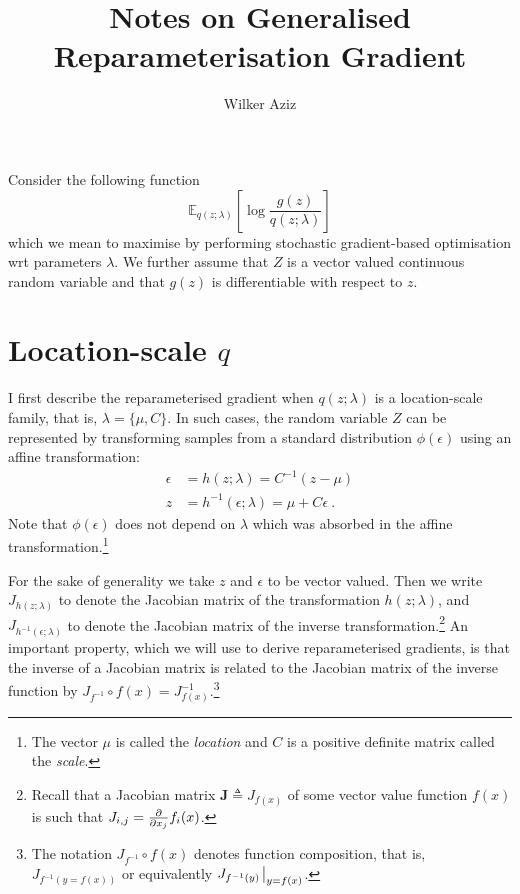 \documentclass[11pt]{article}
\title{Notes on Generalised Reparameterisation Gradient}
\author{Wilker Aziz}
\begin{document}
\maketitle

Consider the following function
\begin{equation}\label{eq:objective}
	\mathbb E_{q(z; \lambda)} \left [ \log \frac{g(z)}{q(z; \lambda)} \right]
\end{equation}
which we mean to maximise by performing stochastic gradient-based optimisation wrt parameters $\lambda$.
We further assume that $Z$ is a vector valued continuous random variable and that $g(z)$ is differentiable with respect to $z$.

\section{Location-scale $q$}

I first describe the reparameterised gradient when $q(z; \lambda)$ is a location-scale family, that is, $\lambda = \{\mu, C\}$.
In such cases, the random variable $Z$ can be represented by transforming samples from a standard distribution $\phi(\epsilon)$ using an affine transformation:
\begin{subequations}\label{eq:h}
\begin{align}
\epsilon &= h(z; \lambda) = C^{-1} (z - \mu)  \\
z &= h^{-1}(\epsilon; \lambda) = \mu + C\epsilon ~ .
\end{align}
\end{subequations}
Note that $\phi(\epsilon)$ does not depend on $\lambda$ which was absorbed in the affine transformation.\footnote{The vector $\mu$ is called the \emph{location} and $C$ is a positive definite matrix called the \emph{scale}.}
 

For the sake of generality we take $z$ and $\epsilon$ to be vector valued. 
Then we write $J_{h(z; \lambda)}$ to denote the Jacobian matrix of the transformation $h(z; \lambda)$, and $J_{h^{-1}(\epsilon; \lambda)}$ to denote the Jacobian matrix of the inverse transformation.\footnote{Recall that a Jacobian matrix $\mathbf J \triangleq J_{f(x)}$ of some vector value function $f(x)$ is such that $J_{i,j} = \pdv{x_j} f_i(x)$.} 
An important property, which we will use to derive reparameterised gradients, is that the inverse of a Jacobian matrix is related to the Jacobian matrix of the inverse function by $J_{f^{-1}} \circ f(x)= J^{-1}_{f(x)}$.\footnote{The notation $J_{f^{-1}} \circ f(x)$ denotes function composition, that is, $J_{f^{-1}(y=f(x))}$ or equivalently $J_{f^{-1}(y)}\evaluated_{y=f(x)}$.}
\end{document}
